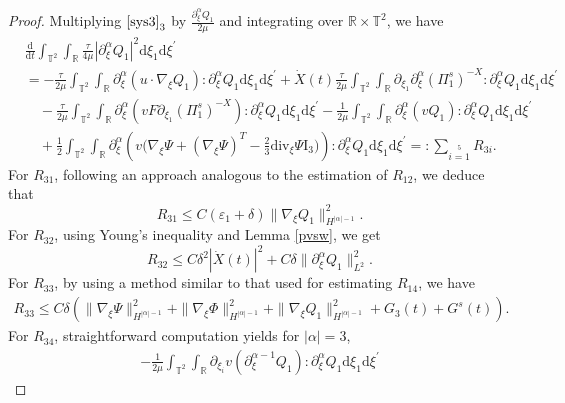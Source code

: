 \documentclass[10pt,reqno]{amsart}
\numberwithin{equation}{section}
\newcommand{\dif}{\mathrm{d}}
\newcommand{\ddiv}{\mathrm{div}}
\begin{document}
\begin{proof}
Multiplying $\eqref{sys3}_3$ by $\frac{\partial_\xi^\alpha Q_1}{2\mu}$ and integrating over $\mathbb{R}\times\mathbb{T}^2$, we have
\begin{align*}
&\frac{\dif}{\dif t}\int_{\mathbb{T}^2}\int_{\mathbb{R}}
\frac{\tau}{4\mu}|\partial_\xi^\alpha Q_1|^2
\dif \xi_1\dif \xi^{\prime}\\
&=-\frac{\tau}{2\mu}\int_{\mathbb{T}^2}\int_{\mathbb{R}}\partial_\xi^\alpha\left( u\cdot\nabla_\xi Q_1\right):\partial_\xi^\alpha Q_1\dif \xi_1\dif \xi^{\prime}
+\dot{X}(t)\frac{\tau}{2\mu}\int_{\mathbb{T}^2}\int_{\mathbb{R}}\partial_{\xi_1}\partial_\xi^\alpha (\Pi_1^s)^{-X}:\partial_\xi^\alpha Q_1\dif \xi_1\dif \xi^{\prime}\\
&\quad-\frac{\tau}{2\mu}\int_{\mathbb{T}^2}\int_{\mathbb{R}}\partial_\xi^\alpha \left(v F\partial_{\xi_1}(\Pi_1^s)^{-X}\right):\partial_\xi^\alpha Q_1\dif \xi_1\dif \xi^{\prime}
-\frac{1}{2\mu}\int_{\mathbb{T}^2}\int_{\mathbb{R}}\partial_\xi^\alpha \left(vQ_1\right):\partial_\xi^\alpha Q_1\dif \xi_1\dif \xi^{\prime}\\
&\quad+\frac{1}{2}\int_{\mathbb{T}^2}\int_{\mathbb{R}}
\partial_\xi^\alpha \left(v\Big(\nabla_\xi\Psi+\left(\nabla_\xi\Psi\right)^T
   -\frac{2}{3}\ddiv_\xi\Psi \mathrm I_3\Big)\right):\partial_\xi^\alpha Q_1\dif \xi_1\dif \xi^{\prime}=:\sum\limits_{i=1}\limits^5R_{3i}.
\end{align*}
For $R_{31}$, following an approach analogous to the estimation of $R_{12}$, we deduce that
\begin{equation}\label{r31}
R_{31}\le C(\varepsilon_1+\delta)\|\nabla_\xi Q_1\|_{H^{|\alpha|-1}}^2.
\end{equation}
For $R_{32}$, using Young's inequality and Lemma \ref{pvsw}, we get
\begin{equation}\label{r32}
R_{32}\le C\delta^2|\dot{X}(t)|^2+C\delta\|\partial_\xi^\alpha Q_1\|_{L^2}^2.
\end{equation}
For $R_{33}$, by using a method similar to that used for estimating $R_{14}$, we have
\begin{equation}\label{r33}
\begin{aligned}
R_{33}\le C\delta\left(\|\nabla_\xi\Psi\|_{H^{|\alpha|-1}}^2+\|\nabla_\xi\Phi\|_{H^{|\alpha|-1}}^2+\|\nabla_\xi Q_1\|_{H^{|\alpha|-1}}^2+G_3(t)+G^s(t)\right)
.
\end{aligned}
\end{equation}
For $R_{34}$, straightforward computation yields for $|\alpha|=3$,
\begin{align*}
-\frac{1}{2\mu}\int_{\mathbb{T}^2}\int_{\mathbb{R}}\partial_{\xi_i}v  \left(\partial_\xi^{\alpha-1} Q_1\right):\partial_\xi^\alpha Q_1\dif \xi_1\dif \xi^{\prime}

\end{align*}
\end{proof}
\end{document}
